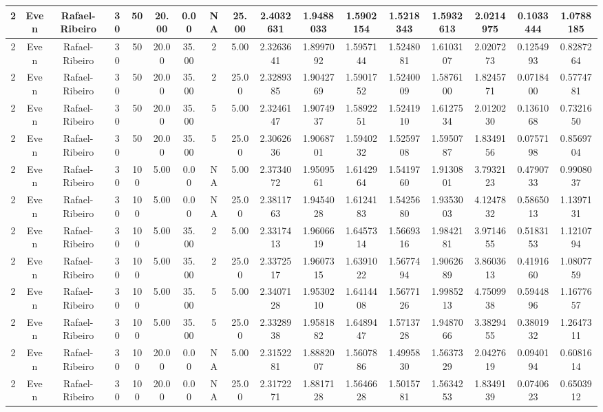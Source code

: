 \documentclass[a4paper]{article}
\begin{document}
\begin{center}
\begin{tabular}{ | c | c | c | c | c | c | c | c | c | c | c | c | c | c | c | c | c | }
		\hline
		2	&	Even	&	Rafael-Ribeiro	&	30	&	50	&	20.00	&	0.00	&	NA	&	25.00	&	2.4032631	&	1.9488033	&	1.5902154	&	1.5218343	&	1.5932613	&	2.0214975	&	0.1033444	&	1.0788185 \\
		\hline
		2	&	Even	&	Rafael-Ribeiro	&	30	&	50	&	20.00	&	35.00	&	2	&	5.00	&	2.3263641	&	1.8997092	&	1.5957144	&	1.5248081	&	1.6103107	&	2.0207273	&	0.1254993	&	0.8287264 \\
		\hline
		2	&	Even	&	Rafael-Ribeiro	&	30	&	50	&	20.00	&	35.00	&	2	&	25.00	&	2.3289385	&	1.9042769	&	1.5901752	&	1.5240009	&	1.5876100	&	1.8245771	&	0.0718400	&	0.5774781 \\
		\hline
		2	&	Even	&	Rafael-Ribeiro	&	30	&	50	&	20.00	&	35.00	&	5	&	5.00	&	2.3246147	&	1.9074937	&	1.5892251	&	1.5241910	&	1.6127534	&	2.0120230	&	0.1361068	&	0.7321650 \\
		\hline
		2	&	Even	&	Rafael-Ribeiro	&	30	&	50	&	20.00	&	35.00	&	5	&	25.00	&	2.3062636	&	1.9068701	&	1.5940232	&	1.5259708	&	1.5950787	&	1.8349156	&	0.0757198	&	0.8569704 \\
		\hline
		2	&	Even	&	Rafael-Ribeiro	&	30	&	100	&	5.00	&	0.00	&	NA	&	5.00	&	2.3734072	&	1.9509561	&	1.6142964	&	1.5419760	&	1.9130801	&	3.7932123	&	0.4790733	&	0.9908037 \\
		\hline
		2	&	Even	&	Rafael-Ribeiro	&	30	&	100	&	5.00	&	0.00	&	NA	&	25.00	&	2.3811763	&	1.9454028	&	1.6124183	&	1.5425680	&	1.9353003	&	4.1247832	&	0.5865013	&	1.1397131 \\
		\hline
		2	&	Even	&	Rafael-Ribeiro	&	30	&	100	&	5.00	&	35.00	&	2	&	5.00	&	2.3317413	&	1.9606619	&	1.6457314	&	1.5669316	&	1.9842181	&	3.9714655	&	0.5183153	&	1.1210794 \\
		\hline
		2	&	Even	&	Rafael-Ribeiro	&	30	&	100	&	5.00	&	35.00	&	2	&	25.00	&	2.3372517	&	1.9607315	&	1.6391022	&	1.5677494	&	1.9062689	&	3.8603613	&	0.4191660	&	1.0807759 \\
		\hline
		2	&	Even	&	Rafael-Ribeiro	&	30	&	100	&	5.00	&	35.00	&	5	&	5.00	&	2.3407128	&	1.9530210	&	1.6414408	&	1.5677126	&	1.9985213	&	4.7509938	&	0.5944896	&	1.1677657 \\
		\hline
		2	&	Even	&	Rafael-Ribeiro	&	30	&	100	&	5.00	&	35.00	&	5	&	25.00	&	2.3328938	&	1.9581882	&	1.6489447	&	1.5713728	&	1.9487066	&	3.3829455	&	0.3801932	&	1.2647311 \\
		\hline
		2	&	Even	&	Rafael-Ribeiro	&	30	&	100	&	20.00	&	0.00	&	NA	&	5.00	&	2.3152281	&	1.8882007	&	1.5607886	&	1.4995830	&	1.5637329	&	2.0427619	&	0.0940194	&	0.6081614 \\
		\hline
		2	&	Even	&	Rafael-Ribeiro	&	30	&	100	&	20.00	&	0.00	&	NA	&	25.00	&	2.3172271	&	1.8817128	&	1.5646628	&	1.5015781	&	1.5634253	&	1.8349139	&	0.0740623	&	0.6503912 \\

\end{tabular}
\end{center}
\end{document}
